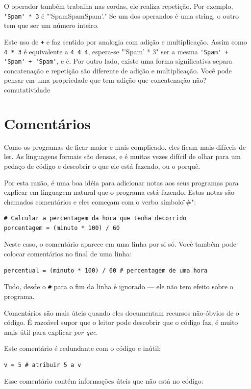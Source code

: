 \documentclass[10pt]{book}
\begin{document}
O {\tt *} operador também trabalha nas cordas, ele realiza repetição.
Por exemplo, \verb "'Spam' * 3" é \verbo "'SpamSpamSpam'." Se um dos operandos
é uma string, o outro tem que ser um número inteiro.

Este uso de {\tt +} e {\tt *} faz sentido por
analogia com adição e multiplicação. Assim como {\tt 4 * 3} é
equivalente a {\tt 4 4 4}, espera-se \verbo "'Spam' * 3" ser a mesma
\Verb "'Spam' + 'Spam' + 'Spam'", e é. Por outro lado, existe uma
forma significativa separa concatenação e repetição são
diferente de adição e multiplicação.
Você pode pensar em uma propriedade que tem adição
que concatenação não?
\index{} comutatividade


\section{Comentários}

Como os programas de ficar maior e mais complicado, eles ficam mais difíceis
de ler. As linguagens formais são densas, e é muitas vezes difícil de
olhar para um pedaço de código e descobrir o que ele está fazendo, ou o porquê.

Por esta razão, é uma boa idéia para adicionar notas aos seus programas para explicar
em linguagem natural que o programa está fazendo. Estas notas são chamados
{comentários \bf} e eles começam com o verbo símbolo \"#":

\begin{verbatim}
# Calcular a percentagem da hora que tenha decorrido
porcentagem = (minuto * 100) / 60
\end{verbatim}
%
Neste caso, o comentário aparece em uma linha por si só. Você também pode colocar
comentários no final de uma linha:

\begin{verbatim}
percentual = (minuto * 100) / 60 # percentagem de uma hora
\end{verbatim}
%
Tudo, desde o {\tt \#} para o fim da linha é ignorado --- ele
não tem efeito sobre o programa.

Comentários são mais úteis quando eles documentam recursos não-óbvios de
o código. É razoável supor que o leitor pode descobrir
{\Em que} o código faz, é muito mais útil para explicar {\em por que}.

Este comentário é redundante com o código e inútil:

\begin{verbatim}
v = 5 # atribuir 5 a v
\end{verbatim}
%
Esse comentário contém informações úteis que não está no código:
\end{document}
